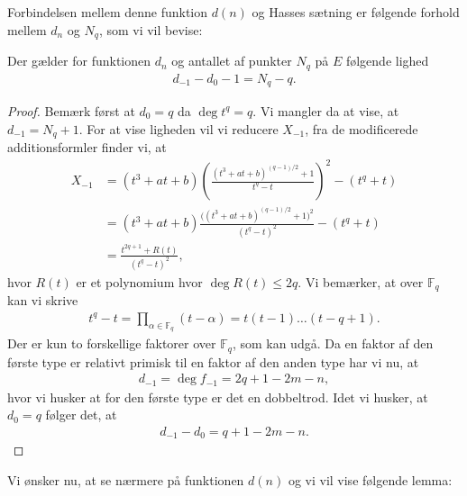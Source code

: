 Forbindelsen mellem denne funktion $d(n)$ og Hasses sætning er følgende forhold
mellem $d_n$ og $N_q$, som vi vil bevise:

\begin{lemma}
Der gælder for funktionen $d_n$ og antallet af punkter $N_q$ på $E$
følgende lighed
\begin{align}
d_{-1} - d_0 - 1 = N_q - q.
\end{align}
\end{lemma}
\begin{proof}
Bemærk først at $d_0 = q$ da $\deg t^q = q$. Vi mangler da at vise, at 
$d_{-1} = N_q + 1$. For at vise ligheden vil vi reducere $X_{-1}$, fra
de modificerede additionsformler finder vi, at 
\begin{align*}
	X_{-1} &= (t^3 + at +b) \left( \frac{(t^3+at+b)^{(q-1)/2}+1}{t^q - t} \right)^2
	- (t^q + t) \\
	&= (t^3 + at + b) \frac{\big((t^3+at+b)^{(q-1)/2}+1 \big)^2}{(t^q - t)^2} 
	- (t^q + t) \\
	&= \frac{t^{2q+1} + R(t)}{(t^q - t)^2},
\end{align*}
hvor $R(t)$ er et polynomium hvor $\deg R(t) \leq 2q$. Vi bemærker, at over 
$\mathbb{F}_q$ kan vi skrive
\begin{align*}
	t^q - t = \prod_{\alpha \in \mathbb{F}_q} (t-\alpha) = t(t-1)\ldots (t-q+1).
\end{align*}
Der er kun to forskellige faktorer over $\mathbb{F}_q$, som kan udgå. Da en faktor
af den første type er relativt primisk til en faktor af den anden type har vi nu,
at 
\begin{align*}
	d_{-1} = \deg f_{-1} = 2q + 1 - 2m - n,
\end{align*}
hvor vi husker at for den første type er det en dobbeltrod. Idet vi husker, at 
$d_0 = q$ følger det, at 
\begin{align*}
	d_{-1} - d_0 = q + 1 - 2m - n.
\end{align*}
\end{proof}

Vi ønsker nu, at se nærmere på funktionen $d(n)$ og vi vil vise følgende lemma:

